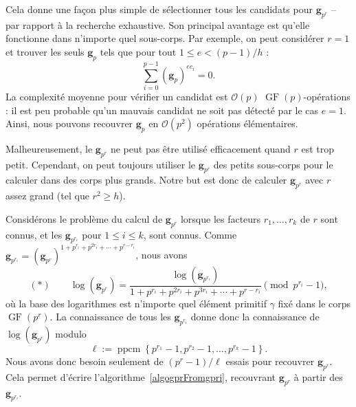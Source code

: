 \documentclass[a4paper, titlepage, 11pt]{article}
\theoremstyle{definition}
\theoremstyle{remark}
\def\O{\mathcal O}
\def\gf{\operatorname{GF}}
\def\ppcm{\operatorname{ppcm}}
\def\mbf#1{\mathbf{#1}}
\begin{document}
Cela donne une façon plus simple de sélectionner tous les candidats pour $\mbf g_{p^r}$ -- par rapport à la recherche exhaustive. Son principal avantage est qu'elle fonctionne dans n'importe quel sous-corps. Par exemple, on peut considérer $r=1$ et trouver les seuls $\mbf g_p$ tels que pour tout $1 \leqslant e < (p-1)/h$ :
$$\sum_{i=0}^{p-1} (\mbf g_p)^{ec_i} = 0.$$
La complexité moyenne pour vérifier un candidat est $\O(p)$ $\gf(p)$-opérations : il est peu probable qu'un mauvais candidat ne soit pas détecté par le cas $e = 1$. Ainsi, nous pouvons recouvrer $\mbf g_p$ en $\O(p^2)$ opérations élémentaires.

Malheureusement, le $\mbf g_{p^r}$ ne peut pas être utilisé efficacement quand $r$ est trop petit. Cependant, on peut toujours utiliser le $\mbf g_{p^r}$ des petits sous-corps pour le calculer dans des corps plus grands. Notre but est donc de calculer $\mbf g_{p^r}$ avec $r$ assez grand (tel que $r^2 \geqslant h$). 

Considérons le problème du calcul de $\mbf g_{p^r}$ lorsque les facteurs $r_1,\dots,r_k$  de $r$ sont connus, et les $\mbf g_{p^{r_i}}$ pour $1 \leqslant i \leqslant k$, sont connus. Comme $\mbf g_{p^{r_i}} = (\mbf g_{p^r})^{1+p^{r_i}+p^{2r_i}+\cdots+p^{r-r_i}}$, nous avons 
$$(\ast)\qquad\log(\mbf g_{p^r}) = \frac{\log(\mbf g_{p^{r_i}})}{1+p^{r_i}+p^{2r_i}+p^{3r_i}+\cdots+p^{r-r_i}} \pmod{p^{r_i}-1},$$
où la base des logarithmes est n'importe quel élément primitif $\gamma$ fixé dans le corps $\gf(p^r)$. La connaissance de tous les $\mbf g_{p^{r_i}}$ donne donc la connaissance de $\log(\mbf g_{p^r})$ modulo
$$\ell := \ppcm \left\{p^{r_1} - 1, p^{r_2}-1, \dots, p^{r_k} -1\right\}.$$
Nous avons donc besoin seulement de $(p^r-1)/\ell$ essais pour recouvrer $\mbf g_{p^r}$.
Cela permet d'écrire l'algorithme~\ref{algogprFromgpri}, recouvrant $\mbf g_{p^r}$ à partir des $\mbf g_{p^{r_i}}$.
\end{document}
